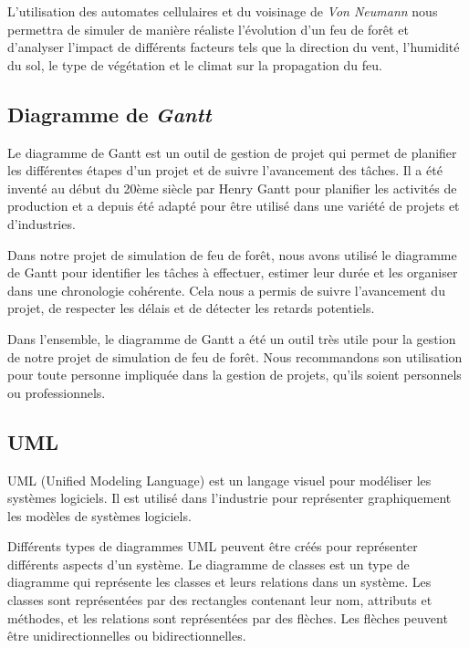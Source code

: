 L'utilisation des automates cellulaires et du voisinage de \textit{Von Neumann} nous permettra de simuler de manière réaliste l'évolution d'un feu de forêt et d'analyser l'impact de différents facteurs tels que la direction du vent, l'humidité du sol, le type de végétation et le climat sur la propagation du feu.

\subsection{Diagramme de \textit{Gantt}}

Le diagramme de Gantt est un outil de gestion de projet qui permet de planifier les différentes étapes d'un projet et de suivre l'avancement des tâches. Il a été inventé au début du 20ème siècle par Henry Gantt pour planifier les activités de production et a depuis été adapté pour être utilisé dans une variété de projets et d'industries. 

Dans notre projet de simulation de feu de forêt, nous avons utilisé le diagramme de Gantt pour identifier les tâches à effectuer, estimer leur durée et les organiser dans une chronologie cohérente. Cela nous a permis de suivre l'avancement du projet, de respecter les délais et de détecter les retards potentiels.

Dans l’ensemble, le diagramme de Gantt a été un outil très utile pour la gestion de notre projet de simulation de feu de forêt. Nous recommandons son utilisation pour toute personne impliquée dans la gestion de projets, qu’ils soient personnels ou professionnels.


\subsection{UML}

UML (Unified Modeling Language) est un langage visuel pour modéliser les systèmes logiciels. Il est utilisé dans l'industrie pour représenter graphiquement les modèles de systèmes logiciels. 

Différents types de diagrammes UML peuvent être créés pour représenter différents aspects d'un système. Le diagramme de classes est un type de diagramme qui représente les classes et leurs relations dans un système. Les classes sont représentées par des rectangles contenant leur nom, attributs et méthodes, et les relations sont représentées par des flèches. Les flèches peuvent être unidirectionnelles ou bidirectionnelles. 

